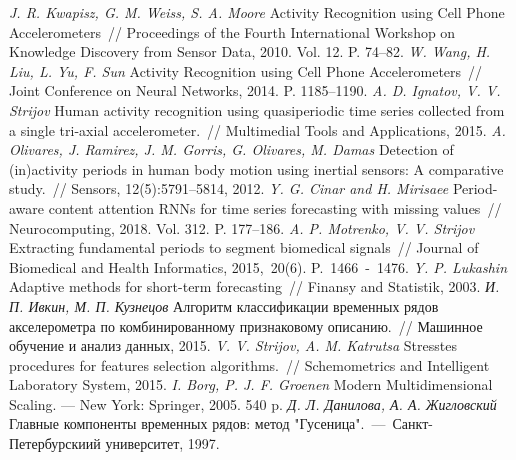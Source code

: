 \begin{thebibliography}{10}
	\textit{J. R. Kwapisz, G. M. Weiss, S. A. Moore} Activity Recognition using Cell Phone Accelerometers~// Proceedings of the Fourth International Workshop on Knowledge Discovery from Sensor Data, 2010. Vol. 12. P. 74--82.
	\textit{W. Wang, H. Liu, L. Yu, F. Sun} Activity Recognition using Cell Phone Accelerometers~// Joint Conference on Neural Networks, 2014. P. 1185--1190.
	\textit{A. D. Ignatov, V. V. Strijov} Human activity recognition using quasiperiodic time series collected from a single tri-axial accelerometer.~// Multimedial Tools and Applications, 2015.
	\textit{A. Olivares, J. Ramirez, J. M. Gorris, G. Olivares, M. Damas} Detection of (in)activity periods in human body motion using inertial sensors: A comparative study.~// Sensors, 12(5):5791–5814, 2012.
	\textit{Y. G. Cinar and H. Mirisaee} Period-aware content attention RNNs for time series forecasting with missing values~// Neurocomputing, 2018. Vol. 312. P. 177--186.
	\textit{A. P. Motrenko, V. V. Strijov} Extracting fundamental periods to segment biomedical signals~// Journal of Biomedical and Health Informatics, 2015,~20(6). P.~1466~-~1476.
	\textit{Y. P. Lukashin} Adaptive methods for short-term forecasting~// Finansy and Statistik, 2003.
	\textit{И. П. Ивкин,  М. П. Кузнецов} Алгоритм классификации временных рядов акселерометра по комбинированному признаковому описанию.~// Машинное обучение и анализ данных, 2015.
	\textit{V. V. Strijov, A. M. Katrutsa} Stresstes procedures for features selection algorithms.~// Schemometrics and Intelligent Laboratory System, 2015.
	\textit{I. Borg, P. J. F. Groenen} Modern Multidimensional Scaling. --- New York: Springer, 2005. 540 p.
	\textit{Д. Л. Данилова, А. А. Жигловский} Главные компоненты временных рядов: метод "Гусеница".~---~Санкт-Петербурскиий университет, 1997.
	

\end{thebibliography}
